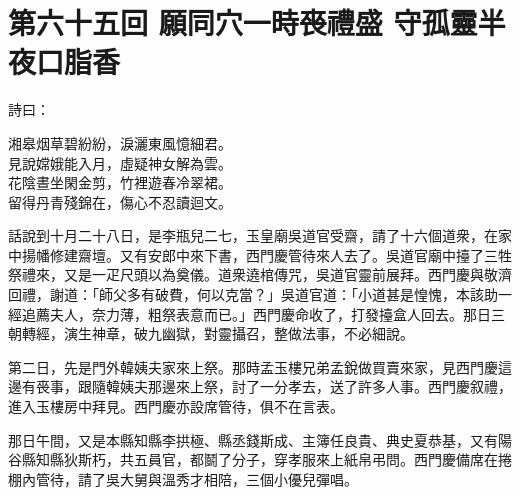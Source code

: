 
\chapter*{第六十五回 願同穴一時䘮禮盛 守孤靈半夜口脂香}


詩曰：

\begin{myquote} 
湘皋烟草碧紛紛，淚灑東風憶細君。\\見說嫦娥能入月，虛疑神女解為雲。\\花陰晝坐閑金剪，竹裡遊春冷翠裙。\\留得丹青殘錦在，傷心不忍讀迴文。
\end{myquote} 

話說到十月二十八日，是李瓶兒二七，玉皇廟吳道官受齋，請了十六個道衆，在家中揚幡修建齋壇。又有安郎中來下書，西門慶管待來人去了。吳道官廟中擡了三牲祭禮來，又是一疋尺頭以為奠儀。道衆遶棺傳咒，吳道官靈前展拜。西門慶與敬濟回禮，謝道：「師父多有破費，何以克當？」吳道官道：「小道甚是惶愧，本該助一經追薦夫人，奈力薄，粗祭表意而已。」西門慶命收了，打發擡盒人回去。那日三朝轉經，演生神章，破九幽獄，對靈攝召，整做法事，不必細說。

第二日，先是門外韓姨夫家來上祭。那時孟玉樓兄弟孟銳做買賣來家，{}見西門慶這邊有䘮事，跟隨韓姨夫那邊來上祭，討了一分孝去，送了許多人事。西門慶叙禮，進入玉樓房中拜見。西門慶亦設席管待，俱不在言表。

那日午間，又是本縣知縣李拱極、縣丞錢斯成、主簿任良貴、典史夏恭基，又有陽谷縣知縣狄斯朽，共五員官，都鬬了分子，穿孝服來上紙帛弔問。西門慶備席在捲棚內管待，請了吳大舅與溫秀才相陪，三個小優兒彈唱。

